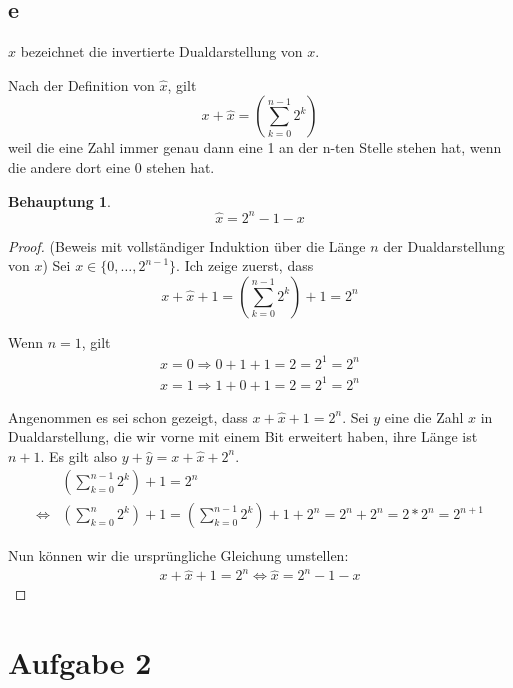 \documentclass[a4paper,10pt]{article}
\newtheorem*{claim}{Behauptung}
\begin{document}
\subsection*{e}

$\hat{x}$ bezeichnet die invertierte Dualdarstellung von $x$.

Nach der Definition von $\hat{x}$, gilt
\begin{equation*}
 x + \hat{x} = (\sum_{k = 0}^{n - 1} 2^k)
\end{equation*}
weil die eine Zahl immer genau dann eine 1 an der n-ten Stelle stehen hat, wenn die andere dort eine 0 stehen hat.

\begin{claim}
 \begin{equation*}
  \hat{x} = 2^n - 1 - x
 \end{equation*}
\end{claim}

\begin{proof}
 (Beweis mit vollständiger Induktion über die Länge $n$ der Dualdarstellung von $x$)
 Sei $x \in \{0, \dots, 2^{n - 1}\}$.
 Ich zeige zuerst, dass 
 \begin{equation*}
  x + \hat{x} + 1 = (\sum_{k = 0}^{n - 1} 2^k) + 1 = 2^n
 \end{equation*}
 
 Wenn $n = 1$, gilt
 \begin{align*}
  x = 0 \Rightarrow 0 + 1 + 1 = 2 = 2^1 = 2^n\\
  x = 1 \Rightarrow 1 + 0 + 1 = 2 = 2^1 = 2^n
 \end{align*}
 
 Angenommen es sei schon gezeigt, dass $x + \hat{x} + 1 = 2^n$.
 Sei $y$ eine die Zahl $x$ in Dualdarstellung, die wir vorne mit einem Bit erweitert haben, ihre Länge ist $n + 1$.
 Es gilt also $y + \hat{y} = x + \hat{x} + 2^n$.
 \begin{align*}
  & (\sum_{k = 0}^{n - 1} 2^k) + 1 = 2^n\\
  \Leftrightarrow & (\sum_{k = 0}^{n} 2^k) + 1 = (\sum_{k = 0}^{n - 1} 2^k) + 1 + 2^n = 2^n + 2^n = 2 * 2^n = 2^{n + 1}
 \end{align*}
 
 Nun können wir die ursprüngliche Gleichung umstellen:
 \begin{align*}
  x + \hat{x} + 1 = 2^n \Leftrightarrow \hat{x} = 2^n - 1 - x
 \end{align*}
\end{proof}

\section*{Aufgabe 2}
\end{document}
